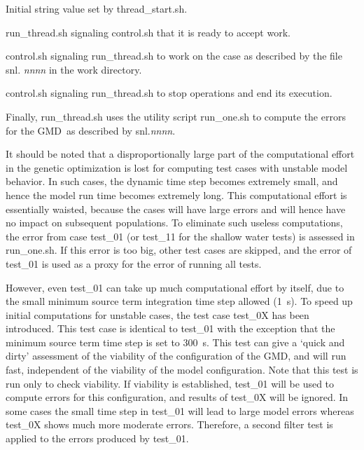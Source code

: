 \documentclass[12pt]{article}
\newcommand{\gmd}{GMD}
\newcommand{\file}{\sf}
\newcommand{\code}{\tt}
\newenvironment{plist}{\begin{list}{nofile ?}{\parsep 0mm
            \itemsep 0mm \leftmargin 35mm \labelwidth 25mm
            \rightmargin 10mm}}{\end{list}}
\newcommand{\pit}[2]{\item[{\code{#1}}\hfill]{#2}}
\begin{document}
\begin{plist}
\pit{starting}      {Initial string value set by {\file thread\_start.sh}.}
\pit{ready to go} {{\file run\_thread.sh} signaling {\file control.sh} that it
                     is ready to accept work.}
\pit{snl.{\it nnnn}}{{\file control.sh} signaling {\file run\_thread.sh} to
                      work on the case as described by the file {\file snl.{\it
                      nnnn}} in the work directory.}
\pit{done}           {{\file control.sh} signaling {\file run\_thread.sh} to
                     stop operations and end its execution.}
\end{plist}

\noindent
Finally, {\file run\_thread.sh} uses the utility script {\file run\_one.sh} to
compute the errors for the \gmd\ as described by {\file snl.{\it nnnn}}. 

\vspace{\baselineskip}
\noindent
It should be noted that a disproportionally large part of the computational
effort in the genetic optimization is lost for computing test cases with
unstable model behavior. In such cases, the dynamic time step becomes
extremely small, and hence the model run time becomes extremely long. This
computational effort is essentially waisted, because the cases will have large
errors and will hence have no impact on subsequent populations. To eliminate
such useless computations, the error from case {\file test\_01} (or {\file
test\_11} for the shallow water tests) is assessed in {\file run\_one.sh}. If
this error is too big, other test cases are skipped, and the error of {\file
test\_01} is used as a proxy for the error of running all tests.

However, even {\file test\_01} can take up much computational effort by
itself, due to the small minimum source term integration time step allowed
(1~s). To speed up initial computations for unstable cases, the test case
{\file test\_0X} has been introduced. This test case is identical to {\file
test\_01} with the exception that the minimum source term time step is set to
300~s. This test can give a `quick and dirty' assessment of the viability of
the configuration of the GMD, and will run fast, independent of the viability
of the model configuration. Note that this test is run only to check
viability. If viability is established, {\file test\_01} will be used to
compute errors for this configuration, and results of {\file test\_0X} will be
ignored. In some cases the small time step in {\file test\_01} will lead to
large model errors whereas {\file test\_0X} shows much more moderate
errors. Therefore, a second filter test is applied to the errors produced by
{\file test\_01}.
\end{document}
